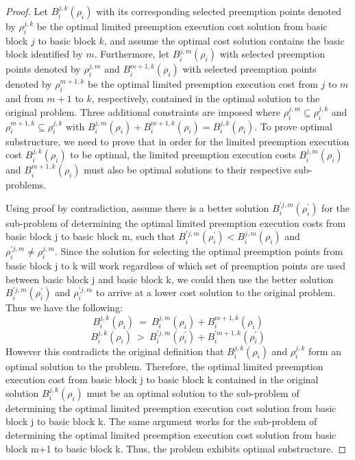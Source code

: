 \begin{proof}
Let $B_{i}^{j,k}(\rho_{i})$ with its corresponding selected preemption points denoted by $\rho_{i}^{j,k}$ be the optimal limited preemption execution cost solution from basic block $j$ to basic block $k$, and assume the optimal cost solution contains the basic block identified by $m$. Furthermore, let $B_{i}^{j,m}(\rho_{i})$ with selected preemption points denoted by $\rho_{i}^{j,m}$ and $B_{i}^{m+1,k}(\rho_{i})$ with selected preemption points denoted by $\rho_{i}^{m+1,k}$ be the optimal limited preemption execution cost from $j$ to $m$ and from $m+1$ to $k$, respectively, contained in the optimal solution to the original problem. Three additional constraints are imposed where $\rho_{i}^{j,m} \subseteq \rho_{i}^{j,k}$ and $\rho_{i}^{m+1,k} \subseteq  \rho_{i}^{j,k}$ with $B_{i}^{j,m}(\rho_{i}) + B_{i}^{m+1,k}(\rho_{i}) = B_{i}^{j,k}(\rho_{i})$. To prove optimal substructure, we need to prove that in order for the limited preemption execution cost $B_{i}^{j,k}(\rho_{i})$ to be optimal, the limited preemption execution costs $B_{i}^{j,m}(\rho_{i})$ and $B_{i}^{m+1,k}(\rho_{i})$ must also be optimal solutions to their respective sub-problems.

Using proof by contradiction, assume there is a better solution $B_{i}^{'j,m}(\rho_{i}^{'})$ for the sub-problem of determining the optimal limited preemption execution costs from basic block j to basic block m, such that $B_{i}^{'j,m}(\rho_{i}^{'}) < B_{i}^{j,m}(\rho_{i})$ and $\rho_{i}^{'j,m} \neq \rho_{i}^{j,m}$. Since the solution for selecting the optimal preemption points from basic block j to k will work regardless of which set of preemption points are used between basic block j and basic block k, we could then use the better solution  $B_{i}^{'j,m}(\rho_{i}^{'})$ and $\rho_{i}^{'j,m}$ to arrive at a lower cost solution to the original problem. Thus we have the following:
\begin{equation}\label{eqn:pcost-bb-1}
B_{i}^{j,k}(\rho_{i})\ =\ B_{i}^{j,m}(\rho_{i}) + B_{i}^{m+1,k}(\rho_{i})
\end{equation}
\begin{equation}\label{eqn:pcost-bb-2}
B_{i}^{j,k}(\rho_{i})\ >\ B_{i}^{'j,m}(\rho_{i}^{'}) + B_{i}^{'m+1,k}(\rho_{i}^{'})
\end{equation}
\noindent
However this contradicts the original definition that $B_{i}^{j,k}(\rho_{i})$ and $\rho_{i}^{j,k}$ form an optimal solution to the problem. Therefore, the optimal limited preemption execution cost from basic block j to basic block k contained in the original solution $B_{i}^{j,k}(\rho_{i})$ must be an optimal solution to the sub-problem of determining the optimal limited preemption execution cost solution from basic block j to basic block k. The same argument works for the sub-problem of determining the optimal limited preemption execution cost solution from basic block m+1 to basic block k. Thus, the problem exhibits optimal substructure.
\end{proof}
